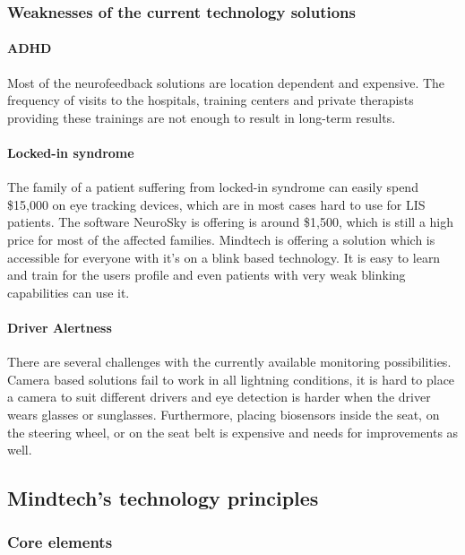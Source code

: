 \documentclass[letterpaper,10pt]{article}
\let\oldsubsection\subsection
\renewcommand{\subsection}{\def\cursectioning{subsection}\oldsubsection}
\begin{document}
\subsubsection{Weaknesses of the current technology solutions}

\paragraph{ADHD} Most of the neurofeedback solutions are location dependent and expensive. The frequency of visits to the hospitals, training centers and private therapists providing these trainings are not enough to result in long-term results.

\paragraph{Locked-in syndrome}The family of a patient suffering from locked-in syndrome can easily spend \$15,000 on eye tracking devices, which are in most cases hard to use for LIS patients. The software NeuroSky is offering is around \$1,500, which is still a high price for most of the affected families. Mindtech is offering a solution which is accessible for everyone with it's on a blink based technology. It is easy to learn and train for the users profile and even patients with very weak blinking capabilities can use it.

\paragraph{Driver Alertness}There are several challenges with the currently available monitoring possibilities. Camera based solutions fail to work in all lightning conditions, it is hard to place a camera to suit different drivers and eye detection is harder when the driver wears glasses or sunglasses. Furthermore, placing biosensors inside the seat, on the steering wheel, or on the seat belt is expensive and needs for improvements as well.  \cite{f&s_car}



\subsection{Mindtech's technology principles}

\subsubsection{Core elements}
\end{document}
